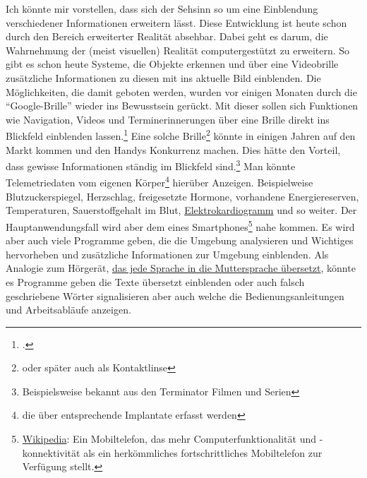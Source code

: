 Ich könnte mir vorstellen, dass sich der Sehsinn so um eine Einblendung verschiedener Informationen
erweitern lässt. Diese Entwicklung ist heute schon durch den Bereich erweiterter Realität absehbar.
Dabei geht es darum, die Wahrnehmung der (meist visuellen) Realität computergestützt zu erweitern. So
gibt es schon heute Systeme, die Objekte erkennen und über eine Videobrille zusätzliche Informationen
zu diesen mit ins aktuelle Bild einblenden. Die Möglichkeiten, die damit geboten werden, wurden vor
einigen Monaten durch die \enquote{Google-Brille} wieder ins Bewusstsein
gerückt. Mit dieser sollen sich Funktionen wie Navigation, Videos und Terminerinnerungen über eine
Brille direkt ins Blickfeld einblenden lassen.\footcite{Heise:TR:Project_Glass}
Eine solche Brille\footnote{oder später auch als
Kontaktlinse} könnte in einigen Jahren auf den Markt kommen und den Handys Konkurrenz machen. Dies
hätte den Vorteil, dass gewisse Informationen ständig im Blickfeld sind.\footnote{Beispielsweise
bekannt aus den Terminator Filmen und Serien} Man könnte Telemetriedaten vom eigenen
Körper\footnote{die über entsprechende Implantate erfasst werden}
hierüber Anzeigen. Beispielweise Blutzuckerspiegel, Herzschlag, freigesetzte Hormone, vorhandene
Energiereserven, Temperaturen, Sauerstoffgehalt im Blut,
\href{http://de.wikipedia.org/wiki/Elektrokardiogramm}{Elektrokardiogramm} und so weiter.
Der Hauptanwendungsfall wird aber dem eines
Smartphones\footnote{\href{http://de.wikipedia.org/wiki/Smartphone}{Wikipedia}: Ein Mobiltelefon, das
mehr Computerfunktionalität und -konnektivität als ein herkömmliches fortschrittliches Mobiltelefon
zur Verfügung stellt.} nahe kommen. Es wird aber auch viele Programme geben, die die Umgebung
analysieren und Wichtiges hervorheben und zusätzliche Informationen zur Umgebung einblenden. Als
Analogie zum Hörgerät, \hyperref[sec:Robin:future:hearing:Babel_Fish]{das jede Sprache in die
Muttersprache übersetzt}, könnte es Programme geben die Texte übersetzt einblenden oder auch falsch
geschriebene Wörter signalisieren aber auch welche die Bedienungsanleitungen und Arbeitsabläufe
anzeigen.
